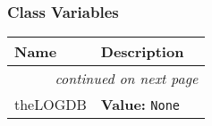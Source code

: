 
  \subsubsection{Class Variables}

    \vspace{-1cm}
\hspace{\varindent}\begin{longtable}{|p{\varnamewidth}|p{\vardescrwidth}|l}
\cline{1-2}
\cline{1-2} \centering \textbf{Name} & \centering \textbf{Description}& \\
\cline{1-2}
\endhead\cline{1-2}\multicolumn{3}{r}{\small\textit{continued on next page}}\\\endfoot\cline{1-2}
\endlastfoot\raggedright t\-h\-e\-L\-O\-G\-D\-B\- & \raggedright \textbf{Value:} 
{\tt None}&\\
\cline{1-2}
\end{longtable}

